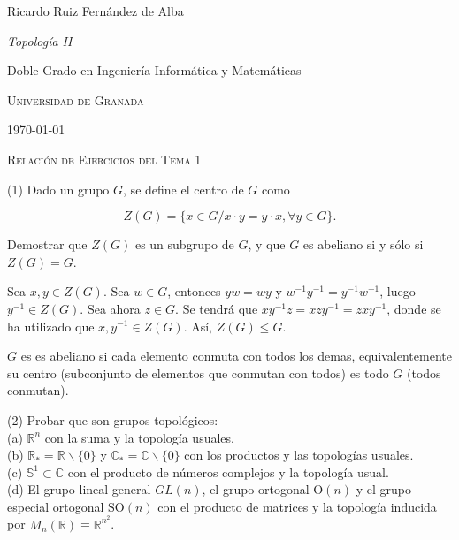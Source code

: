\documentclass[
  a4paper,
  spanish,
  12pt,
]{scrartcl}
\begin{document}
\begin{flushright}
  Ricardo Ruiz Fernández de Alba\vspace{.5em}

  \textit{Topología II}

  Doble Grado en Ingeniería Informática y Matemáticas

  \textsc{Universidad de Granada}\vspace{.5em}

  \today\vspace{.5em}
\end{flushright}

\begin{flushleft}
  \scshape\Large Relación de Ejercicios del Tema 1
\end{flushleft}


\begin{ejer}
(1) Dado un grupo $G$, se define el centro de $G$ como

$$
Z(G)=\{x \in G / x \cdot y=y \cdot x, \forall y \in G\} .
$$

Demostrar que $Z(G)$ es un subgrupo de $G$, y que $G$ es abeliano si y sólo si $Z(G)=G$.\\
\end{ejer}

\begin{sol}

Sea $x, y \in Z(G)$. Sea $w \in G$, entonces $yw = wy$ y $w^{-1}y^{-1} = y^{-1}w^{-1}$, luego $y^{-1} \in Z(G)$.
Sea ahora $z \in G$. Se tendrá que $xy^{-1}z = xzy^{-1} = zxy^{-1}$, donde se ha utilizado que $x,y^{-1} \in Z(G)$.
Así, $Z(G) \leq G$.

$G$ es es abeliano si cada elemento conmuta con todos los demas,
equivalentemente su centro (subconjunto de elementos que conmutan con todos) es todo $G$ 
(todos conmutan).

\end{sol}

\begin{ejer}
(2) Probar que son grupos topológicos:\\
(a) $\mathbb{R}^{n}$ con la suma y la topología usuales.\\
(b) $\mathbb{R}_{*}=\mathbb{R} \backslash\{0\}$ y $\mathbb{C}_{*}=\mathbb{C} \backslash\{0\}$ con los productos y las topologías usuales.\\
(c) $\mathbb{S}^{1} \subset \mathbb{C}$ con el producto de números complejos y la topología usual.\\
(d) El grupo lineal general $GL(n)$, el grupo ortogonal $\mathrm{O}(n)$ y el grupo especial ortogonal $\mathrm{SO}(n)$ con el producto de matrices y la topología inducida por $M_{n}(\mathbb{R}) \equiv \mathbb{R}^{n^{2}}$.\\
\end{ejer}
\end{document}

